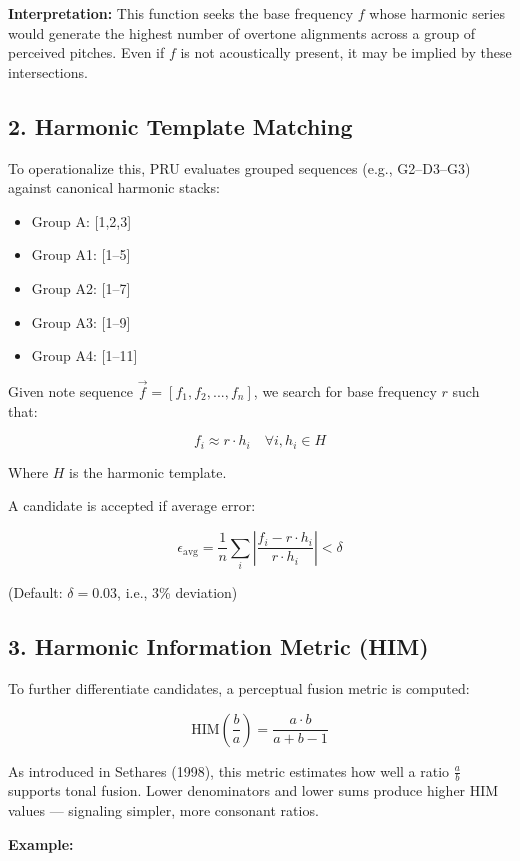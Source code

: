 \documentclass{article}
\begin{document}
\textbf{Interpretation:} This function seeks the base frequency $f$ whose harmonic series would generate the highest number of overtone alignments across a group of perceived pitches. Even if $f$ is not acoustically present, it may be implied by these intersections.

\subsection*{2. Harmonic Template Matching}

To operationalize this, PRU evaluates grouped sequences (e.g., G2–D3–G3) against canonical harmonic stacks:

\begin{itemize}
    \item Group A: [1,2,3]
    \item Group A1: [1–5]
    \item Group A2: [1–7]
    \item Group A3: [1–9]
    \item Group A4: [1–11]
\end{itemize}

Given note sequence $\vec{f} = [f_1, f_2, ..., f_n]$, we search for base frequency $r$ such that:

\[
f_i \approx r \cdot h_i \quad \forall i, h_i \in H
\]

Where $H$ is the harmonic template.

A candidate is accepted if average error:

\[
\epsilon_{\text{avg}} = \frac{1}{n} \sum_i \left| \frac{f_i - r \cdot h_i}{r \cdot h_i} \right| < \delta
\]

(Default: $\delta = 0.03$, i.e., 3\% deviation)

\subsection*{3. Harmonic Information Metric (HIM)}

To further differentiate candidates, a perceptual fusion metric is computed:

\[
\text{HIM}\left(\frac{b}{a}\right) = \frac{a \cdot b}{a + b - 1}
\]

As introduced in Sethares (1998), this metric estimates how well a ratio $\frac{a}{b}$ supports tonal fusion. Lower denominators and lower sums produce higher HIM values — signaling simpler, more consonant ratios.

\textbf{Example:}
\end{document}
